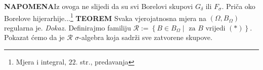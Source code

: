 \documentclass{article}
\begin{document}
\textbf{NAPOMENA}\newline Iz ovoga ne slijedi da su svi Borelovi skupovi \(G_\delta\) ili \(F_\sigma.\) Priča oko Borelove hijerarhije...\footnote[53]{Mjera i integral, \(22.\) str., predavanja}\newline\newline
\textbf{TEOREM}\newline
Svaka vjerojatnosna mjera na \((\Omega, B_\Omega)\) regularna je.\newline\newline
\textit{Dokaz.}\newline
Definirajmo familiju \(\mathcal R:=\left\{B\in B_\Omega\mid\text{ za }B\text{ vrijedi }(*)\right\}.\)\newline Pokazat ćemo da je \(\mathcal R\) \(\sigma\)-algebra koja sadrži sve zatvorene skupove.
\end{document}
